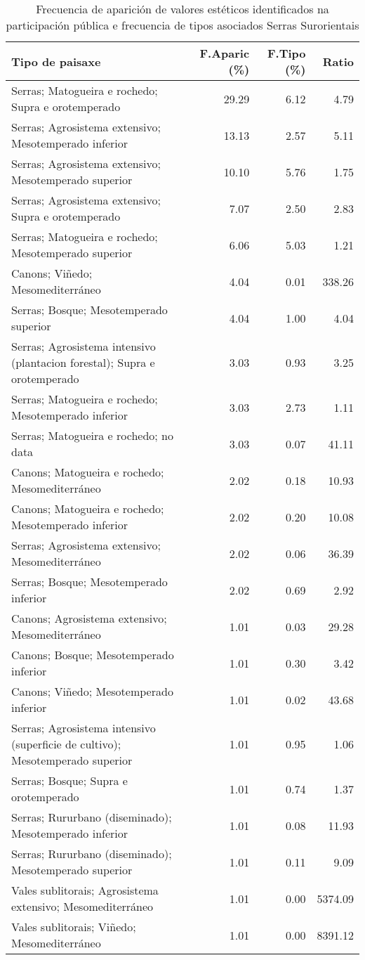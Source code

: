 \begin{table}[p]
\centering
\caption{Frecuencia de aparición de valores estéticos identificados na participación pública e frecuencia de tipos asociados Serras Surorientais} 
\label{vsixotest9}
\begin{tabular}{lrrr}
  \hline
Tipo de paisaxe & F.Aparic (\%) & F.Tipo (\%) & Ratio \\ 
  \hline
Serras; Matogueira e rochedo; Supra e orotemperado & 29.29 & 6.12 & 4.79 \\ 
  Serras; Agrosistema extensivo; Mesotemperado inferior & 13.13 & 2.57 & 5.11 \\ 
  Serras; Agrosistema extensivo; Mesotemperado superior & 10.10 & 5.76 & 1.75 \\ 
  Serras; Agrosistema extensivo; Supra e orotemperado & 7.07 & 2.50 & 2.83 \\ 
  Serras; Matogueira e rochedo; Mesotemperado superior & 6.06 & 5.03 & 1.21 \\ 
  Canons; Viñedo; Mesomediterráneo & 4.04 & 0.01 & 338.26 \\ 
  Serras; Bosque; Mesotemperado superior & 4.04 & 1.00 & 4.04 \\ 
  Serras; Agrosistema intensivo (plantacion forestal); Supra e orotemperado & 3.03 & 0.93 & 3.25 \\ 
  Serras; Matogueira e rochedo; Mesotemperado inferior & 3.03 & 2.73 & 1.11 \\ 
  Serras; Matogueira e rochedo; no data & 3.03 & 0.07 & 41.11 \\ 
  Canons; Matogueira e rochedo; Mesomediterráneo & 2.02 & 0.18 & 10.93 \\ 
  Canons; Matogueira e rochedo; Mesotemperado inferior & 2.02 & 0.20 & 10.08 \\ 
  Serras; Agrosistema extensivo; Mesomediterráneo & 2.02 & 0.06 & 36.39 \\ 
  Serras; Bosque; Mesotemperado inferior & 2.02 & 0.69 & 2.92 \\ 
  Canons; Agrosistema extensivo; Mesomediterráneo & 1.01 & 0.03 & 29.28 \\ 
  Canons; Bosque; Mesotemperado inferior & 1.01 & 0.30 & 3.42 \\ 
  Canons; Viñedo; Mesotemperado inferior & 1.01 & 0.02 & 43.68 \\ 
  Serras; Agrosistema intensivo (superficie de cultivo); Mesotemperado superior & 1.01 & 0.95 & 1.06 \\ 
  Serras; Bosque; Supra e orotemperado & 1.01 & 0.74 & 1.37 \\ 
  Serras; Rururbano (diseminado); Mesotemperado inferior & 1.01 & 0.08 & 11.93 \\ 
  Serras; Rururbano (diseminado); Mesotemperado superior & 1.01 & 0.11 & 9.09 \\ 
  Vales sublitorais; Agrosistema extensivo; Mesomediterráneo & 1.01 & 0.00 & 5374.09 \\ 
  Vales sublitorais; Viñedo; Mesomediterráneo & 1.01 & 0.00 & 8391.12 \\ 
   \hline
\end{tabular}
\end{table}
